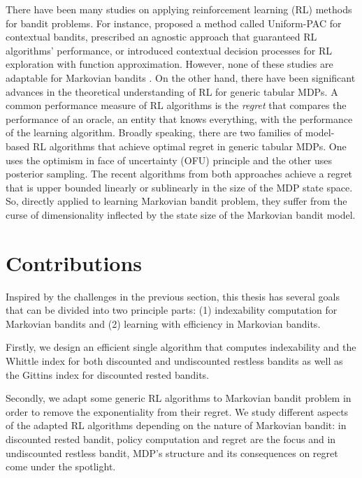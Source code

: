 There have been many studies on applying reinforcement learning (RL) methods for bandit problems.
For instance, \cite{dann2017unifying} proposed a method called Uniform-PAC for contextual bandits, \cite{zanette2018problem} prescribed an agnostic approach that guaranteed RL algorithms' performance, or \cite{jiang2017contextual} introduced contextual decision processes for RL exploration with function approximation.
However, none of these studies are adaptable for Markovian bandits \cite{nakhleh2021neurwin}.
On the other hand, there have been significant advances in the theoretical understanding of RL for generic tabular MDPs.
A common performance measure of RL algorithms is the \emph{regret} that compares the performance of an oracle, an entity that knows everything, with the performance of the learning algorithm.
Broadly speaking, there are two families of model-based RL algorithms that achieve optimal regret in generic tabular MDPs.
One uses the optimism in face of uncertainty (OFU) principle and the other uses posterior sampling.
The recent algorithms from both approaches achieve a regret that is upper bounded linearly or sublinearly in the size of the MDP state space.  
So, directly applied to learning Markovian bandit problem, they suffer from the curse of dimensionality inflected by the state size of the Markovian bandit model.

\section{Contributions}

Inspired by the challenges in the previous section, this thesis has several goals that can be divided into two principle parts: (1) indexability computation for Markovian bandits and (2) learning with efficiency in Markovian bandits.

Firstly, we design an efficient single algorithm that computes indexability and the Whittle index for both discounted and undiscounted restless bandits as well as the Gittins index for discounted rested bandits.

Secondly, we adapt some generic RL algorithms to Markovian bandit problem in order to remove the exponentiality from their regret.
We study different aspects of the adapted RL algorithms depending on the nature of Markovian bandit: in discounted rested bandit, policy computation and regret are the focus and in undiscounted restless bandit, MDP's structure and its consequences on regret come under the spotlight.

